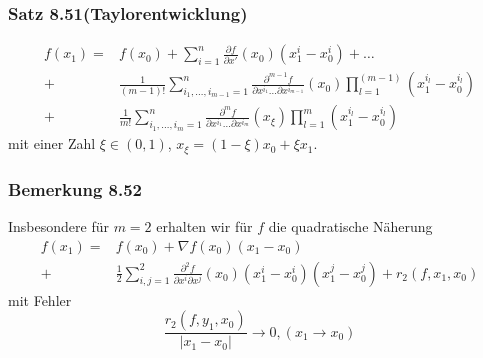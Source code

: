 \subsubsection*{Satz 8.51(Taylorentwicklung)}
\begin{align*}
f\left( {{x_1}} \right) = & f\left( {{x_0}} \right) + \sum\limits_{i = 1}^n {\frac{{\partial f}}{{\partial x'}}\left( {{x_0}} \right)\left( {x_1^i - x_0^i} \right) +  \ldots } \\
 + & \frac{1}{{\left( {m - 1} \right)!}}\sum\limits_{{i_1}, \ldots ,{i_{m - 1}} = 1}^n {\frac{{{\partial ^{m - 1}}f}}{{\partial {x^{{i_1}}} \ldots \partial {x^{{i_{m - 1}}}}}}\left( {{x_0}} \right)\prod\limits_{l = 1}^{\left( {m - 1} \right)} {\left( {x_1^{{i_l}} - x_0^{{i_l}}} \right)} } \\
 + & \frac{1}{{m!}}\sum\limits_{{i_1}, \ldots ,{i_m} = 1}^n {\frac{{{\partial ^m}f}}{{\partial {x^{{i_1}}} \ldots \partial {x^{{i_m}}}}}\left( {{x_\xi }} \right)\prod\limits_{l = 1}^m {\left( {x_1^{{i_l}} - x_0^{{i_l}}} \right)} }
\end{align*}
mit einer Zahl $\xi\in\left( 0,1\right)$, $x_\xi = \left( 1-\xi\right)x_0+\xi x_1$.

\subsubsection*{Bemerkung 8.52}
Insbesondere für $m=2$ erhalten wir für $f$ die quadratische Näherung
\begin{align*}
f\left( {{x_1}} \right) = & f\left( {{x_0}} \right) + \nabla f\left( {{x_0}} \right)\left( {{x_1} - {x_0}} \right)\\
 + &\frac{1}{2}\sum\limits_{i,j = 1}^2 {\frac{{{\partial ^2}f}}{{\partial {x^i}\partial {x^j}}}\left( {{x_0}} \right)\left( {x_1^i - x_0^i} \right)} \left( {x_1^j - x_0^j} \right) + {r_2}\left( {f,{x_1},{x_0}} \right)
\end{align*}
mit Fehler
\[\frac{r_2\left( f,y_1,x_0\right)}{\left| x_1-x_0\right|}\to 0, \left( x_1\to x_0\right)\]

